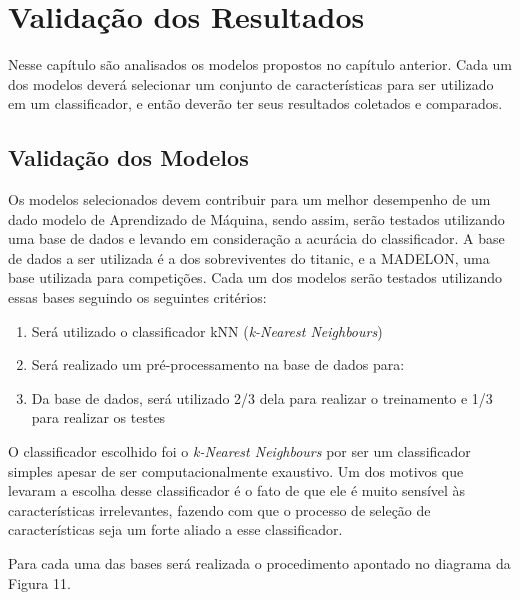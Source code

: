 \chapter[Validação dos Resultados]{Validação dos Resultados}
\label{ch:validacao}

Nesse capítulo são analisados os modelos propostos no capítulo anterior. Cada um dos modelos deverá selecionar um conjunto de características para ser utilizado em um classificador, e então deverão ter seus resultados coletados e comparados. 


\section{Validação dos Modelos}

Os modelos selecionados devem contribuir para um melhor desempenho de um dado modelo de Aprendizado de Máquina, sendo assim, serão testados utilizando uma base de dados e levando em consideração a acurácia do classificador. A base de dados a ser utilizada é a dos sobreviventes do titanic, e a MADELON, uma base utilizada para competições. Cada um dos modelos serão testados utilizando essas bases seguindo os seguintes critérios:

\begin{enumerate}
	\item{Será utilizado o classificador kNN (\textit{k-Nearest Neighbours})}
	\item{Será realizado um pré-processamento na base de dados para:}
	\item{Da base de dados, será utilizado 2/3 dela para realizar o treinamento e 1/3 para realizar os testes}
\end{enumerate}

O classificador escolhido foi o \textit{k-Nearest Neighbours} por ser um classificador simples apesar de ser computacionalmente exaustivo. Um dos motivos que levaram a escolha desse classificador é o fato de que ele é muito sensível às características irrelevantes, fazendo com que o processo de seleção de características seja um forte aliado a esse classificador.

Para cada uma das bases será realizada o procedimento apontado no diagrama da Figura 11.

